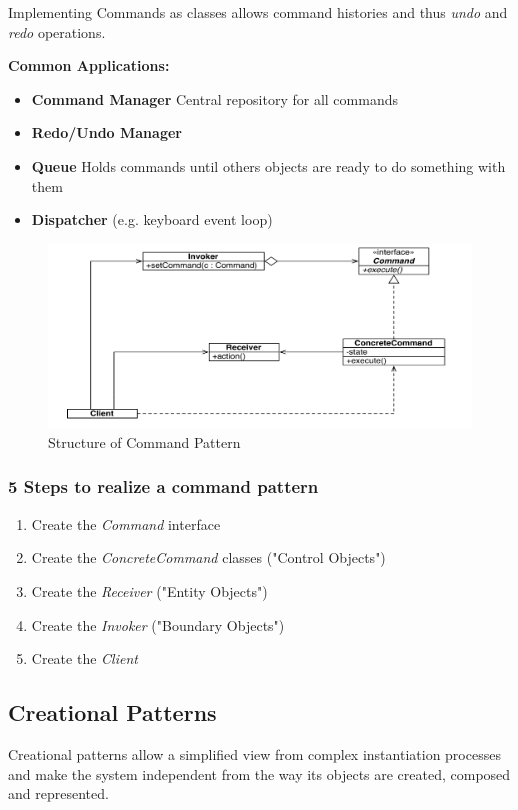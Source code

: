 Implementing Commands as classes allows command histories and thus \textit{undo} and \textit{redo} operations.\newline

\textbf{Common Applications:}
\begin{itemize}[topsep=5pt, itemsep=0pt]
  \item \textbf{Command Manager} Central repository for all commands
  \item \textbf{Redo/Undo Manager}
  \item \textbf{Queue} Holds commands until others objects are ready to do something with them
  \item \textbf{Dispatcher} (e.g. keyboard event loop)
\end{itemize}

\begin{figure}[h]
	\centering
	\includegraphics[width=\linewidth]{images/pattern_command.png}
	\caption{Structure of Command Pattern}
\end{figure}

\subsubsection*{5 Steps to realize a command pattern}
\begin{enumerate}[topsep=5pt, itemsep=0pt]
  \item Create the \textit{Command} interface
  \item Create the \textit{ConcreteCommand} classes ("Control Objects")
  \item Create the \textit{Receiver} ("Entity Objects")
  \item Create the \textit{Invoker} ("Boundary Objects")
  \item Create the \textit{Client}
\end{enumerate}

\newpage


\subsection{Creational Patterns}
Creational patterns allow a simplified view from complex instantiation processes and make the system independent from the way its objects are created, composed and represented.

